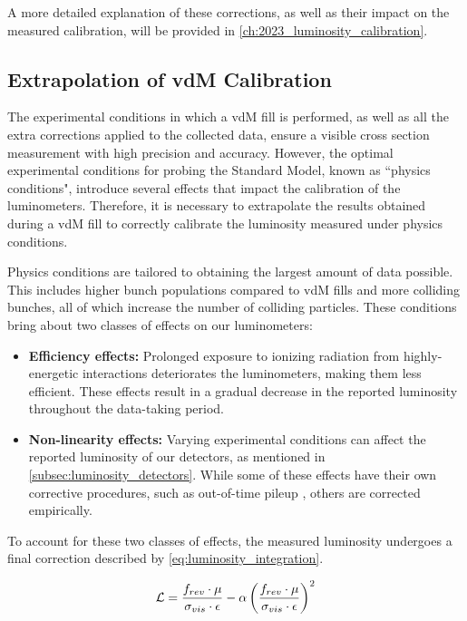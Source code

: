 A more detailed explanation of these corrections, as well as their impact on the measured calibration, will be provided in \autoref{ch:2023_luminosity_calibration}.

\subsection{Extrapolation of vdM Calibration}
\label{subsec:extrapolation_of_vdM_calibration}

The experimental conditions in which a vdM fill is performed, as well as all the extra corrections applied to the collected data, ensure a visible cross section measurement with high precision and accuracy. However, the optimal experimental conditions for probing the Standard Model, known as ``physics conditions", introduce several effects that impact the calibration of the luminometers. Therefore, it is necessary to extrapolate the results obtained during a vdM fill to correctly calibrate the luminosity measured under physics conditions.

Physics conditions are tailored to obtaining the largest amount of data possible. This includes higher bunch populations compared to vdM fills and more colliding bunches, all of which increase the number of colliding particles. These conditions bring about two classes of effects on our luminometers:

\begin{itemize}
    \item \textbf{Efficiency effects:} Prolonged exposure to ionizing radiation from highly-energetic interactions deteriorates the luminometers, making them less efficient. These effects result in a gradual decrease in the reported luminosity throughout the data-taking period.
    \item \textbf{Non-linearity effects:} Varying experimental conditions can affect the reported luminosity of our detectors, as mentioned in \autoref{subsec:luminosity_detectors}. While some of these effects have their own corrective procedures, such as out-of-time pileup \cite{Sirunyan:2759951}, others are corrected empirically.
\end{itemize}

To account for these two classes of effects, the measured luminosity undergoes a final correction described by \autoref{eq:luminosity_integration}.

\begin{equation}
    \centering
    \mathcal{L} = \frac{f_{rev} \cdot \mu}{\sigma_{vis} \cdot \epsilon} - \alpha \left( \frac{f_{rev} \cdot \mu}{\sigma_{vis} \cdot \epsilon} \right)^{2}
    \label{eq:luminosity_integration}
\end{equation}

